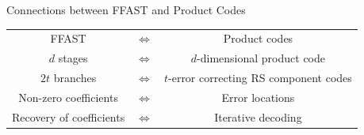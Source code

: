 \begin{frame}{Connections between FFAST and Product Codes}
{	{\hspace{20 pt} \begin{tabular}{ccc}
	 	FFAST & $\Leftrightarrow$ & Product codes \\
	 	$d$ stages & $\Leftrightarrow$ & $d$-dimensional product code \\
	 	$2t$ branches & $\Leftrightarrow$ & $t$-error correcting RS component codes \\
	 	Non-zero coefficients & $\Leftrightarrow$ & Error locations \\
	 	Recovery of coefficients & $\Leftrightarrow$ & Iterative decoding
	 \end{tabular}}}
	 	
	\end{frame}
%	
%	   	
